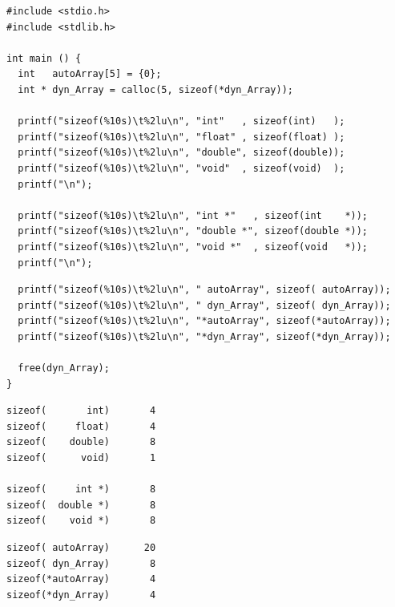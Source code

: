 
\begin{frame}[fragile]
%
%
\begin{codebox}
\begin{verbatim}
#include <stdio.h>
#include <stdlib.h>

int main () {
  int   autoArray[5] = {0};
  int * dyn_Array = calloc(5, sizeof(*dyn_Array));
  
  printf("sizeof(%10s)\t%2lu\n", "int"   , sizeof(int)   );
  printf("sizeof(%10s)\t%2lu\n", "float" , sizeof(float) );
  printf("sizeof(%10s)\t%2lu\n", "double", sizeof(double));
  printf("sizeof(%10s)\t%2lu\n", "void"  , sizeof(void)  );
  printf("\n");
  
  printf("sizeof(%10s)\t%2lu\n", "int *"   , sizeof(int    *));
  printf("sizeof(%10s)\t%2lu\n", "double *", sizeof(double *));
  printf("sizeof(%10s)\t%2lu\n", "void *"  , sizeof(void   *));
  printf("\n");
\end{verbatim}
\end{codebox}
%
\end{frame}


\begin{frame}[fragile]
%
\begin{codebox}[...Fortsetztung]
\begin{verbatim}
  printf("sizeof(%10s)\t%2lu\n", " autoArray", sizeof( autoArray));
  printf("sizeof(%10s)\t%2lu\n", " dyn_Array", sizeof( dyn_Array));
  printf("sizeof(%10s)\t%2lu\n", "*autoArray", sizeof(*autoArray));
  printf("sizeof(%10s)\t%2lu\n", "*dyn_Array", sizeof(*dyn_Array));

  free(dyn_Array);
}
\end{verbatim}
\end{codebox}
%
\begin{cmdbox}[Ausgabe, equal height group=A]
\begin{verbatim}
sizeof(       int)       4
sizeof(     float)       4
sizeof(    double)       8
sizeof(      void)       1

sizeof(     int *)       8
sizeof(  double *)       8
sizeof(    void *)       8
\end{verbatim}
\end{cmdbox}
%
\begin{cmdbox}[...Fortsetzung, equal height group=A]
\begin{verbatim}
sizeof( autoArray)      20
sizeof( dyn_Array)       8
sizeof(*autoArray)       4
sizeof(*dyn_Array)       4
\end{verbatim}
\end{cmdbox}
%
\end{frame}

